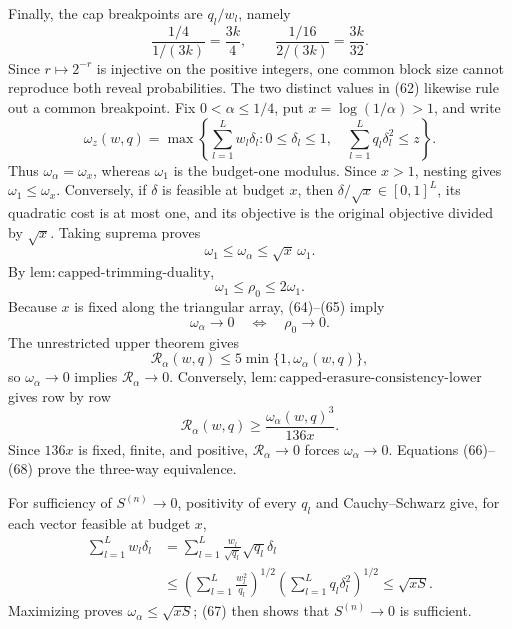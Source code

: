 Finally, the cap breakpoints are \(q_l/w_l\), namely
\[
 \frac{1/4}{1/(3k)}=\frac{3k}{4},
 \qquad
 \frac{1/16}{2/(3k)}=\frac{3k}{32}.
\tag{62}
\]
Since \(r\mapsto2^{-r}\) is injective on the positive integers, one common block size cannot reproduce both reveal probabilities. The two distinct values in (62) likewise rule out a common breakpoint.
Fix \(0<\alpha\le1/4\), put \(x=\log(1/\alpha)>1\), and write
\[
 \omega_z(w,q)=\max\left\{\sum_{l=1}^Lw_l\delta_l:
 0\le\delta_l\le1,\quad
 \sum_{l=1}^Lq_l\delta_l^2\le z\right\}.
\tag{63}
\]
Thus \(\omega_\alpha=\omega_x\), whereas \(\omega_1\) is the budget-one modulus. Since \(x>1\), nesting gives \(\omega_1\le\omega_x\). Conversely, if \(\delta\) is feasible at budget \(x\), then \(\delta/\sqrt{x}\in[0,1]^L\), its quadratic cost is at most one, and its objective is the original objective divided by \(\sqrt{x}\). Taking suprema proves
\[
 \omega_1\le\omega_\alpha\le\sqrt{x}\,\omega_1.
\tag{64}
\]
By \(\mathrm{lem{:}capped\text{-}trimming\text{-}duality}\),
\[
 \omega_1\le\rho_0\le2\omega_1.
\tag{65}
\]
Because \(x\) is fixed along the triangular array, (64)--(65) imply
\[
 \omega_\alpha\to0\quad\Longleftrightarrow\quad\rho_0\to0.
\tag{66}
\]
The unrestricted upper theorem gives
\[
 \mathcal R_\alpha(w,q)\le5\min\{1,\omega_\alpha(w,q)\},
\tag{67}
\]
so \(\omega_\alpha\to0\) implies \(\mathcal R_\alpha\to0\). Conversely, \(\mathrm{lem{:}capped\text{-}erasure\text{-}consistency\text{-}lower}\) gives row by row
\[
 \mathcal R_\alpha(w,q)\ge\frac{\omega_\alpha(w,q)^3}{136x}.
\tag{68}
\]
Since \(136x\) is fixed, finite, and positive, \(\mathcal R_\alpha\to0\) forces \(\omega_\alpha\to0\). Equations (66)--(68) prove the three-way equivalence.

For sufficiency of \(S^{(n)}\to0\), positivity of every \(q_l\) and Cauchy--Schwarz give, for each vector feasible at budget \(x\),
\[
\begin{aligned}
 \sum_{l=1}^Lw_l\delta_l
 &=\sum_{l=1}^L\frac{w_l}{\sqrt{q_l}}\sqrt{q_l}\delta_l\\
 &\le\left(\sum_{l=1}^L\frac{w_l^2}{q_l}\right)^{1/2}
       \left(\sum_{l=1}^Lq_l\delta_l^2\right)^{1/2}
 \le\sqrt{xS}.
\end{aligned}
\tag{69}
\]
Maximizing proves \(\omega_\alpha\le\sqrt{xS}\); (67) then shows that \(S^{(n)}\to0\) is sufficient.

